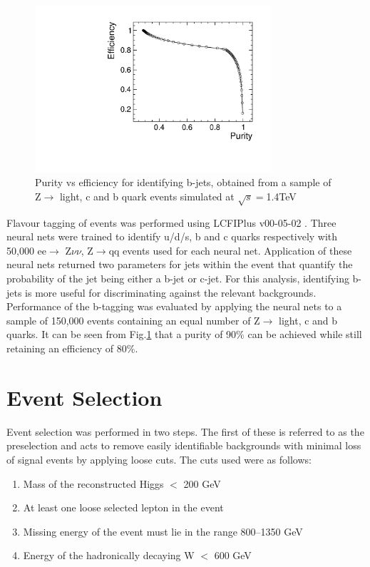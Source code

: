 \begin{figure}[b]
  \centering
  \includegraphics[width=0.78\textwidth,keepaspectratio]{HiggsAnalysis/figures/updatedpurityvsefficiency.pdf}
  \caption[B-Tagging Purity vs Efficiency]{Purity vs efficiency for identifying b-jets, obtained from a sample of Z$\rightarrow$ light, c and b quark events simulated at $\sqrt{s}=$1.4TeV}
  \label{btag}
\end{figure}

Flavour tagging of events was performed using LCFIPlus v00-05-02 \cite{Suehara:2015ura}. Three neural nets were trained to identify u/d/s, b and c quarks respectively with 50,000 ee$\rightarrow$ Z$\nu\nu$, Z$\rightarrow$qq events used for each neural net. Application of these neural nets returned two parameters for jets within the event that quantify the probability of the jet being either a b-jet or c-jet. For this analysis, identifying b-jets is more useful for discriminating against the relevant backgrounds. Performance of the b-tagging was evaluated by applying the neural nets to a sample of 150,000 events containing an equal number of Z$\rightarrow$ light, c and b quarks. It can be seen from Fig.\ref{btag} that a purity of 90\% can be achieved while still retaining an efficiency of 80\%.

\section{Event Selection}

Event selection was performed in two steps. The first of these is referred to as the preselection and acts to remove easily identifiable backgrounds with minimal loss of signal events by applying loose cuts. The cuts used were as follows:

\begin{enumerate}

\item Mass of the reconstructed Higgs $<$ 200 GeV
\item At least one loose selected lepton in the event
\item Missing energy of the event must lie in the range 800--1350 GeV
\item Energy of the hadronically decaying W $<$ 600 GeV

\end{enumerate}


